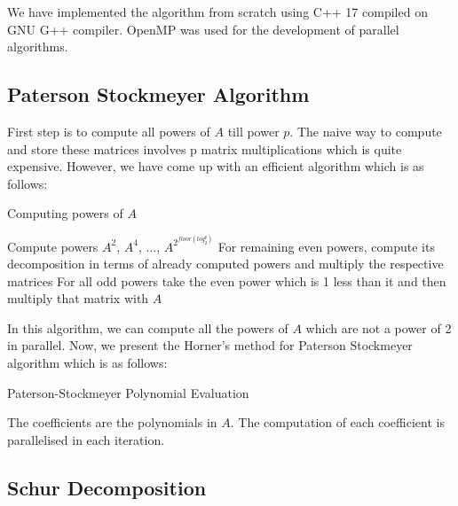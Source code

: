 \documentclass[12pt,a4paper]{article}
\begin{document}
We have implemented the algorithm from scratch using C++ 17 compiled on GNU G++ compiler. OpenMP was used for the development of parallel algorithms. 



\subsection{Paterson Stockmeyer Algorithm}
First step is to compute all powers of $A$ till power $p$. The naive way to compute and store these matrices involves p matrix multiplications which is quite expensive. However, we have come up with an efficient algorithm which is as follows:

\begin{algorithm}
\caption{Computing powers of $A$}\label{alg:cap}
\begin{algorithmic}[1]
\State Compute powers $A^{2}$, $A^{4}$, ..., $A^{2^{floor({log_{2}^{p}})}}$
\State For remaining even powers, compute its decomposition in terms of already computed powers and multiply the respective matrices
\State For all odd powers take the even power which is 1 less than it and then multiply that matrix with $A$
\end{algorithmic}
\end{algorithm}



In this algorithm, we can compute all the powers of $A$ which are not a power of 2 in parallel. Now, we present the Horner's method for Paterson Stockmeyer algorithm which is as follows: 

\begin{algorithm}
\caption{Paterson-Stockmeyer Polynomial Evaluation}\label{euclid}
\begin{algorithmic}[1]
\State $Q$ = 0
\State {}
     \State {$Q$ = {$Q.A^p + Q_p$} \Comment{Horner's Method}
\EndFor
\end{algorithmic}
\end{algorithm}
\newpage
The coefficients are the polynomials in $A$. The computation of each coefficient is parallelised in each iteration. 

\subsection{Schur Decomposition}
\end{document}
